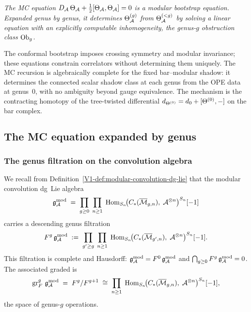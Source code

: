 \begin{center}
\emph{The MC equation $D_{\mathcal{A}}\,\Theta_{\mathcal{A}}
+ \tfrac{1}{2}[\Theta_{\mathcal{A}},\Theta_{\mathcal{A}}] = 0$
is a modular bootstrap equation. Expanded genus by genus,
it determines $\Theta^{(g)}_{\mathcal{A}}$ from $\Theta^{(<g)}_{\mathcal{A}}$
by solving a linear equation with an explicitly computable
inhomogeneity, the genus-$g$ obstruction class $\mathrm{Ob}_g$.}
\end{center}

The conformal bootstrap imposes crossing symmetry and modular
invariance; these equations constrain correlators without
determining them uniquely. The MC recursion is algebraically
complete for the fixed bar--modular shadow: it determines the
connected scalar shadow class at each genus from the OPE data at
genus~$0$, with no ambiguity beyond gauge equivalence. The
mechanism is the
contracting homotopy of the tree-twisted differential
$d_{\Theta^{(0)}} = d_0 + [\Theta^{(0)}, -]$ on the
bar complex.

%
%

\subsection{The MC equation expanded by genus}

\subsubsection{The genus filtration on the convolution algebra}

We recall from Definition~\ref*{V1-def:modular-convolution-dg-lie}
that the modular convolution dg~Lie algebra
\begin{equation}%
\gAmod
\;=\;
\prod_{g \geq 0}\;
\prod_{n \geq 1}\;
\Hom_{S_n}\!\bigl(
C_*(\overline{\cM}_{g,n}),\;
\cA^{\otimes n}
\bigr)^{S_n}[-1]
\end{equation}
carries a descending genus filtration
\begin{equation}%
F^g\,\gAmod
\;:=\;
\prod_{g' \geq g}\;
\prod_{n \geq 1}\;
\Hom_{S_n}\!\bigl(
C_*(\overline{\cM}_{g',n}),\;
\cA^{\otimes n}
\bigr)^{S_n}[-1].
\end{equation}
This filtration is complete and Hausdorff:
$\mathfrak{g}_{\mathcal{A}}^{\mathrm{mod}} = F^0\,\mathfrak{g}_{\mathcal{A}}^{\mathrm{mod}}$ and
$\bigcap_{g \geq 0} F^g\,\mathfrak{g}_{\mathcal{A}}^{\mathrm{mod}} = 0$.
The associated graded is
\begin{equation}%
\gr^g_F\,\gAmod
\;=\;
F^g / F^{g+1}
\;\cong\;
\prod_{n \geq 1}\;
\Hom_{S_n}\!\bigl(
C_*(\overline{\cM}_{g,n}),\;
\cA^{\otimes n}
\bigr)^{S_n}[-1],
\end{equation}
the space of genus-$g$ operations.

